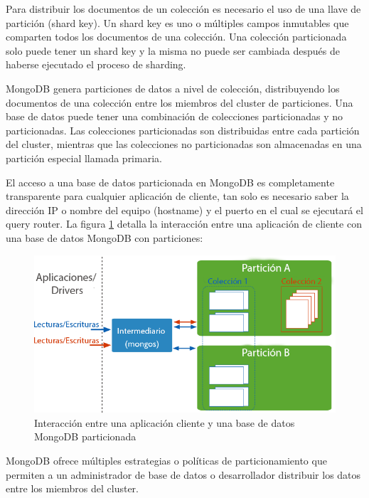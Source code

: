 Para distribuir los documentos de un colección es necesario el uso de una llave de partición (shard key). Un shard key es uno o
múltiples campos inmutables que comparten todos los documentos de una colección. Una colección particionada solo puede tener un shard key
y la misma no puede ser cambiada después de haberse ejecutado el proceso de sharding.

MongoDB genera particiones de datos a nivel de colección, distribuyendo los documentos de una colección entre los miembros
del cluster de particiones. Una base de datos puede tener una combinación de colecciones particionadas y no particionadas.
Las colecciones particionadas son distribuidas entre cada partición del cluster, mientras que las colecciones no particionadas son
almacenadas en una partición especial llamada primaria.

El acceso a una base de datos particionada en MongoDB es completamente transparente para cualquier aplicación de cliente, tan
solo es necesario saber la dirección IP o nombre del equipo (hostname) y el puerto en el cual se ejecutará el query router.
La figura \ref{fig:sharding_apps} detalla la interacción entre una aplicación de cliente con una base de datos MongoDB con particiones:

\begin{figure}[H]
	\centering
		\includegraphics[width=.7\textwidth]{figures/sharding_apps}
	\caption{Interacción entre una aplicación cliente y una base de datos MongoDB particionada}
	\label{fig:sharding_apps}
\end{figure}

MongoDB ofrece múltiples estrategias o políticas de particionamiento que permiten a un administrador de base de datos
o desarrollador distribuir los datos entre los miembros del cluster.

